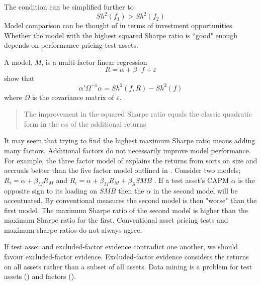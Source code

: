 The condition can be simplified further to
\[
Sh^2(f_1)>Sh^2(f_2)
\]
Model comparison can be thought of in terms of investment opportunities.
Whether the model with the highest squared Sharpe ratio is ``good" enough 
depends on performance pricing test assets.

A model, $M$, is a multi-factor linear regression
\[
R = \alpha + \beta\cdot f + \varepsilon
\]
\cite{gibbons1989test} show that
\[
\alpha ' \Omega^{-1}\alpha = Sh^2(f, R) - Sh^2(f)
\]
where $\Omega$ is the covariance matrix of $\varepsilon$.

\begin{quotation}
  The improvement in the squared Sharpe ratio equals the classic quadratic 
  form in the $\alpha$s of the additional returns
\end{quotation}

It may seem that trying to find the highest maximum Sharpe ratio means adding 
many factors.
Additional factors do not necessarily improve model performance.
For example, the three factor model of \cite{fama1993common} explains the 
returns from sorts on size and accruals better than the five factor model 
outlined in \cite{fama2015five}.
Consider two models; $R_i=\alpha+\beta_MR_M$ and 
$R_i=\alpha+\beta_MR_M+\beta_SSMB$ .
If a test asset's CAPM $\alpha$ is the opposite sign to its loading on $SMB$ 
then the $\alpha$ in the second model will be accentuated.
By conventional measures the second model is then "worse" than the first model.
The maximum Sharpe ratio of the second model is higher than the maximum Sharpe 
ratio for the first.
Conventional asset pricing tests and maximum sharpe ratios do not always agree.

If test asset and excluded-factor evidence contradict one another, we should 
favour excluded-factor evidence.
Excluded-factor evidence considers the returns on all assets rather than a 
subset of all assets.
Data mining is a problem for test assets (\cite{lewellen2010skeptical}) and 
factors (\cite{harvey2016and}).
